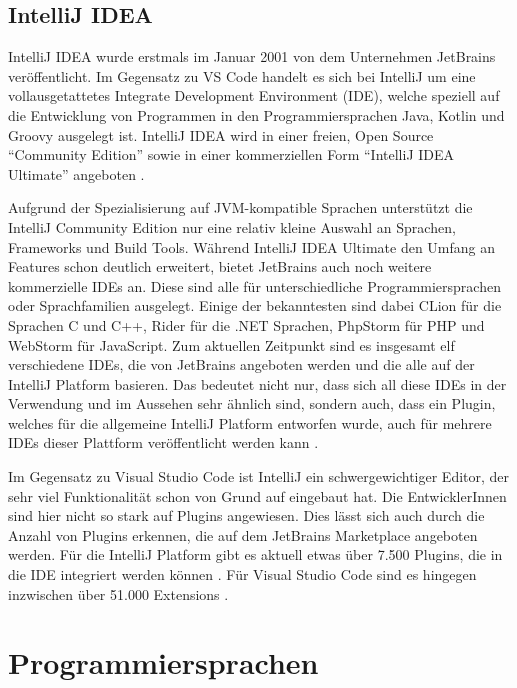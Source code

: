\subsection{IntelliJ IDEA}

IntelliJ IDEA wurde erstmals im Januar 2001 \cite{IntelliJReleasePage}
von dem Unternehmen 
JetBrains veröffentlicht. Im Gegensatz zu VS Code handelt 
es sich bei IntelliJ um eine vollausgetattetes Integrate Development Environment (IDE),
welche speziell auf die Entwicklung 
von Programmen in den Programmiersprachen Java, Kotlin und Groovy ausgelegt ist. 
IntelliJ IDEA wird in einer freien, Open Source 
\enquote{Community Edition} \cite{IntelliJCommunityEditionGithub} sowie in einer kommerziellen Form 
\enquote{IntelliJ IDEA Ultimate} angeboten \cite{HagosTed2022BII:}. 

Aufgrund der Spezialisierung auf JVM-kompatible Sprachen unterstützt 
die IntelliJ Community Edition nur eine relativ kleine Auswahl an 
Sprachen, Frameworks und Build Tools. Während IntelliJ IDEA Ultimate 
den Umfang an Features schon deutlich erweitert, bietet JetBrains auch 
noch weitere kommerzielle IDEs an. Diese sind alle für unterschiedliche 
Programmiersprachen oder Sprachfamilien ausgelegt. Einige der bekanntesten 
sind dabei CLion für die Sprachen C und C++, Rider für die .NET Sprachen, 
PhpStorm für PHP und WebStorm für JavaScript. Zum aktuellen 
Zeitpunkt sind es insgesamt elf verschiedene IDEs, die von JetBrains 
angeboten werden und die alle auf der IntelliJ Platform basieren. Das 
bedeutet nicht nur, dass sich all diese IDEs in der Verwendung und im 
Aussehen sehr ähnlich sind, sondern auch, dass ein Plugin, welches für 
die allgemeine IntelliJ Platform entworfen wurde, 
auch für mehrere IDEs dieser Plattform veröffentlicht werden kann \cite{IntelliJSDKDocumentation}.

Im Gegensatz zu Visual Studio Code ist IntelliJ ein schwergewichtiger
Editor, der sehr viel Funktionalität schon von Grund auf eingebaut 
hat. Die EntwicklerInnen sind hier nicht so stark auf Plugins angewiesen.
Dies lässt sich auch durch die Anzahl von Plugins erkennen, die auf dem 
JetBrains Marketplace angeboten werden. Für die IntelliJ Platform gibt 
es aktuell etwas über 7.500 Plugins, die in die IDE integriert werden können 
\cite{IntelliJMarketplace}.
Für Visual Studio Code sind es hingegen inzwischen über 51.000 Extensions
\cite{VSCodeMarketplace}.


\section{Programmiersprachen}
\label{sec:Programmiersprachen}

